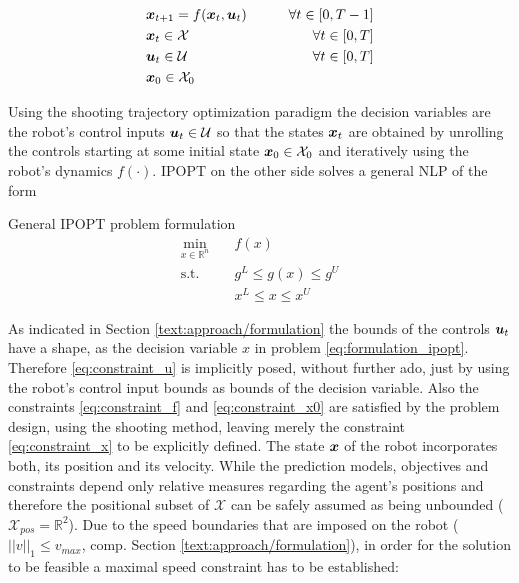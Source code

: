 \begin{align}
\label{eq:constraint_f}
&\boldsymbol{x}_{t+1} = f(\boldsymbol{x}_t, \boldsymbol{u}_t) \qquad& \forall t \in [0, T - 1] \\
\label{eq:constraint_x}
&\boldsymbol{x}_t \in \mathcal{X} & \forall t \in [0, T]\\
\label{eq:constraint_u}
&\boldsymbol{u}_t \in \mathcal{U} & \forall t \in [0, T]\\
\label{eq:constraint_x0}
&\boldsymbol{x}_0 \in \mathcal{X}_0
\end{align}

Using the shooting trajectory optimization paradigm the decision variables are the robot's control inputs  $\boldsymbol{u}_t \in \mathcal{U}$ so that the states $\boldsymbol{x}_t$ are obtained by unrolling the controls starting at some initial state $\boldsymbol{x}_0 \in \mathcal{X}_0$ and iteratively using the robot's dynamics $f(\cdot)$. \ac{IPOPT} on the other side solves a general \ac{NLP} of the form \cite{Wachter2006} \\

\begin{problem}{General IPOPT problem formulation}
\begin{align}
\min_{x \in \mathbb{R}^n} \quad & f(x) \\
\textrm{s.t. } \quad & g^L \leq g(x) \leq g^U \\
& x^L \leq x \leq x^U 
\end{align}
\label{eq:formulation_ipopt}
\end{problem}

As indicated in Section \ref{text:approach/formulation} the bounds of the controls $\boldsymbol{u}_t$ have a shape, as the decision variable $x$ in problem \ref{eq:formulation_ipopt}. Therefore \ref{eq:constraint_u} is implicitly posed, without further ado, just by using the robot's control input bounds as bounds of the decision variable. Also the constraints \ref{eq:constraint_f} and  \ref{eq:constraint_x0} are satisfied by the problem design, using the shooting method, leaving merely the constraint \ref{eq:constraint_x} to be explicitly defined. The state $\boldsymbol{x}$ of the robot incorporates both, its position and its velocity. While the prediction models, objectives and constraints depend only  relative measures regarding the agent's positions and therefore the positional subset of $\mathcal{X}$ can be safely assumed as being unbounded ($\mathcal{X}_{pos} = \mathbb{R}^2$). Due to the speed boundaries that are imposed on the robot ($||v||_1 \leq v_{max}$, comp. Section \ref{text:approach/formulation}), in order for the solution to be feasible a maximal speed constraint has to be established:

